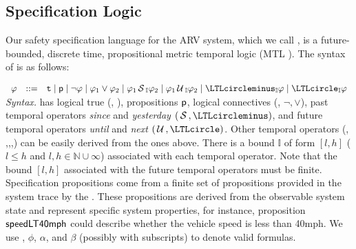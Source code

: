 \subsection{Specification Logic}
Our safety specification language for the ARV system, which we call \planguage, is a future-bounded,
discrete time, propositional metric temporal logic (MTL \cite{Koymans1990}).
The syntax of \planguage is as follows:

\vspace*{1pt}
\(
\begin{array}{ccc}
\policy & ::=  & \true \mid \pred{p} \mid \neg \policy \mid \policy_1\vee \policy_2\mid
\policy_1\since_{\interval}\policy_2 \mid \policy_1\until_{\interval}\policy_2\mid\yesterday_{\interval}\policy\mid \tomorrow_{\interval}\policy
\end{array}
\) \\
\textit{Syntax.}
\planguage has logical true (\ie, \true),
 propositions $\mathsf{p}$, logical connectives (\ie, $\neg, \vee$),
past temporal operators \emph{since} and \emph{yesterday} $(\since, \yesterday)$,
and future temporal operators \emph{until} and \emph{next} $(\until, \tomorrow)$.
Other temporal operators (\ie, \once,\historically,\eventually,\henceforth) can be easily derived
from the ones above.
There is a bound $\mathbb{I}$ of form $[l,h]$ ($l\leq h$ and $l,h\in\mathbb{N}\cup\infty$)
associated with each temporal operator.
Note that the bound  $[l,h]$ associated with the future temporal operators must be finite.
Specification propositions  come from a finite set of propositions provided in
the system trace by the \sfmap.
These propositions are derived from the observable system state and represent specific system properties, for instance,
proposition $\mathsf{speedLT40mph}$ could describe whether the vehicle speed is less than 40mph.
We use \policy, $\phi$, $\alpha$, and $\beta$ (possibly with subscripts) to denote valid \planguage formulas.
%


